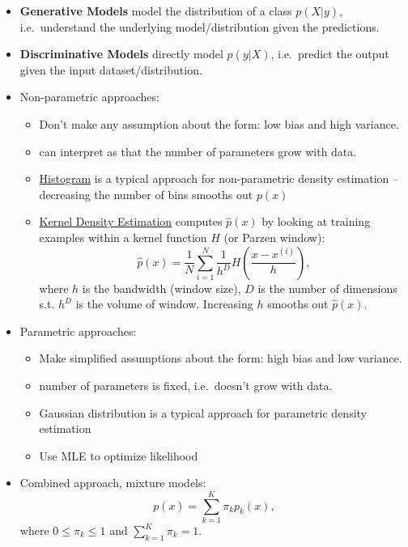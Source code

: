 \documentclass[twocolumn,landscape,10pt]{article}
\theoremstyle{definition}
\begin{document}
\begin{itemize}
    \item \textbf{Generative Models} model the distribution of a class $p(X|y)$,
        i.e.\ understand the underlying model/distribution given the
        predictions.
    \item \textbf{Discriminative Models} directly model $p(y|X)$, i.e.\ predict
        the output given the input dataset/distribution.
    \item Non-parametric approaches:
        \begin{itemize}
            \item Don't make any assumption about the form: low bias and high
                variance.
            \item can interpret as that the number of parameters grow with data.
            \item \underline{Histogram} is a typical approach for non-parametric 
                density estimation -- decreasing the number of bins smooths out $p(x)$
            \item \underline{Kernel Density Estimation} computes $\hat{p}(x)$
                by looking at training examples within a kernel function $H$ (or
                Parzen window):
                \[
                    \hat{p}(x)=\frac{1}{N}\sum_{i=1}^{N}
                    \frac{1}{h^{D}}H\left(\frac{x-x^{(i)}}{h}\right),
                \]
                where $h$ is the bandwidth (window size), $D$ is the number of
                dimensions s.t. $h^{D}$ is the volume of window. Increasing $h$
                smooths out $\hat{p}(x)$.
        \end{itemize} 
    \item Parametric approaches:
        \begin{itemize}
            \item Make simplified assumptions about the form: high bias and low
                variance.
            \item number of parameters is fixed, i.e.\ doesn't grow with data.
            \item Gaussian distribution is a typical approach for parametric
                density estimation
            \item Use MLE to optimize likelihood
        \end{itemize} 
    \item Combined approach, mixture models:
        \[
            p(x)=\sum_{k=1}^{K}\pi_kp_k(x),
        \]
        where $0\le\pi_k\le 1$ and $\sum_{k=1}^{K} \pi_k=1$.
\end{itemize} 
\end{document}
